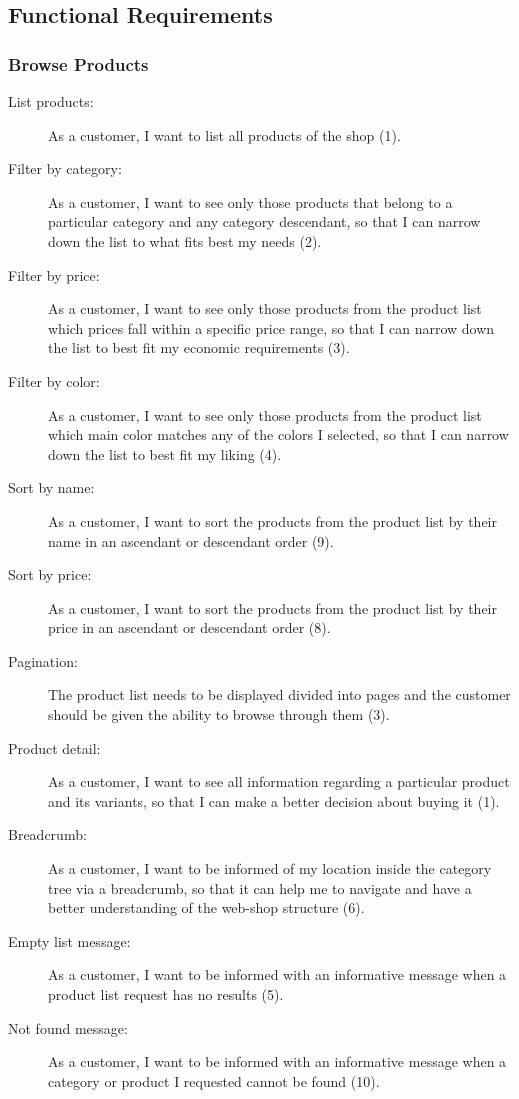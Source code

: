 \subsection{Functional Requirements}
\subsubsection{Browse Products}

\begin{description}
	\item[List products:] As a customer, I want to list all products of the shop (1).
	\item[Filter by category:] As a customer, I want to see only those products that belong to a particular category and any category descendant, so that I can narrow down the list to what fits best my needs (2).
	\item[Filter by price:] As a customer, I want to see only those products from the product list which prices fall within a specific price range, so that I can narrow down the list to best fit my economic requirements (3).
	\item[Filter by color:] As a customer, I want to see only those products from the product list which main color matches any of the colors I selected, so that I can narrow down the list to best fit my liking (4).
	\item[Sort by name:] As a customer, I want to sort the products from the product list by their name in an ascendant or descendant order (9).
	\item[Sort by price:] As a customer, I want to sort the products from the product list by their price in an ascendant or descendant order (8).
	\item[Pagination:] The product list needs to be displayed divided into pages and the customer should be given the ability to browse through them (3).
	\item[Product detail:] As a customer, I want to see all information regarding a particular product and its variants, so that I can make a better decision about buying it (1).
	\item[Breadcrumb:] As a customer, I want to be informed of my location inside the category tree via a breadcrumb, so that it can help me to navigate and have a better understanding of the web-shop structure (6).
	\item[Empty list message:] As a customer, I want to be informed with an informative message when a product list request has no results (5).
	\item[Not found message:] As a customer, I want to be informed with an informative message
when a category or product I requested cannot be found (10).
\end{description}

